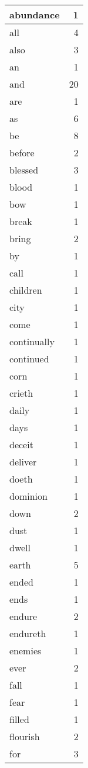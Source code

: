 \begin{center}
\begin{longtable}{l|r}
abundance & 1\\ \hline 
all & 4\\ \hline 
also & 3\\ \hline 
an & 1\\ \hline 
and & 20\\ \hline 
are & 1\\ \hline 
as & 6\\ \hline 
be & 8\\ \hline 
before & 2\\ \hline 
blessed & 3\\ \hline 
blood & 1\\ \hline 
bow & 1\\ \hline 
break & 1\\ \hline 
bring & 2\\ \hline 
by & 1\\ \hline 
call & 1\\ \hline 
children & 1\\ \hline 
city & 1\\ \hline 
come & 1\\ \hline 
continually & 1\\ \hline 
continued & 1\\ \hline 
corn & 1\\ \hline 
crieth & 1\\ \hline 
daily & 1\\ \hline 
days & 1\\ \hline 
deceit & 1\\ \hline 
deliver & 1\\ \hline 
doeth & 1\\ \hline 
dominion & 1\\ \hline 
down & 2\\ \hline 
dust & 1\\ \hline 
dwell & 1\\ \hline 
earth & 5\\ \hline 
ended & 1\\ \hline 
ends & 1\\ \hline 
endure & 2\\ \hline 
endureth & 1\\ \hline 
enemies & 1\\ \hline 
ever & 2\\ \hline 
fall & 1\\ \hline 
fear & 1\\ \hline 
filled & 1\\ \hline 
flourish & 2\\ \hline 
for & 3\\ \hline 

\end{longtable}
\end{center}
